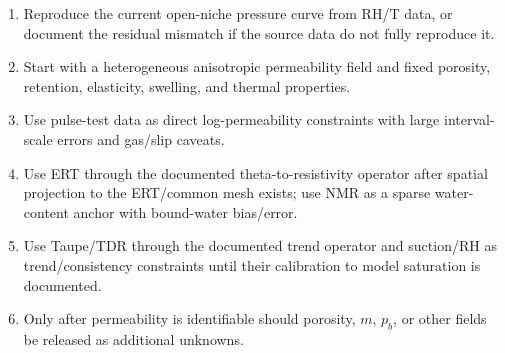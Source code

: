 \begin{enumerate}[leftmargin=1.5em]
  is  with combined objective 3157.70.  The next step is to
  treat  as the current incumbent evidence.
  Five production handoff rounds did not improve it; the local-anisotropy screen
  and cross-stream hybrid screen also found no direct-improving follow-up family.  Use
   as the current decision to pause the active
  direct-permeability plus NMR production sampler and move effort to gated
  measurement streams or a new field family.
  \item Reproduce the current open-niche pressure curve from RH/T data, or document the
  residual mismatch if the source data do not fully reproduce it.
  \item Start with a heterogeneous anisotropic permeability field and fixed porosity,
  retention, elasticity, swelling, and thermal properties.
  \item Use pulse-test data as direct log-permeability constraints with large
  interval-scale errors and gas/slip caveats.
  \item Use ERT through the documented theta-to-resistivity operator after spatial
  projection to the ERT/common mesh exists; use NMR as a sparse water-content anchor
  with bound-water bias/error.
  \item Use Taupe/TDR through the documented trend operator and suction/RH as
  trend/consistency constraints until their calibration to model saturation is
  documented.
  \item Only after permeability is identifiable should porosity, \(m\), \(p_b\), or
  other fields be released as additional unknowns.
\end{enumerate}
